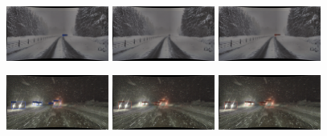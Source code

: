 \documentclass[report.tex]{subfiles}
\begin{document}
\begin{figure}[h!]
        \includegraphics[width=0.3\textwidth]{images/results/mtdetr/samples/snow_1/2018-02-12_09-32-09_00510_gt.png}
        \includegraphics[width=0.3\textwidth]{images/results/mtdetr/samples/snow_1/2018-02-12_09-32-09_00510_m_clr.png}
        \includegraphics[width=0.3\textwidth]{images/results/mtdetr/samples/snow_1/2018-02-12_09-32-09_00510_t_clr.png}

        \includegraphics[width=0.3\textwidth]{images/results/mtdetr/samples/snow_2/2018-02-12_18-05-56_00060_gt.png}
        \includegraphics[width=0.3\textwidth]{images/results/mtdetr/samples/snow_2/2018-02-12_18-05-56_00060_m_clr.png}
        \includegraphics[width=0.3\textwidth]{images/results/mtdetr/samples/snow_2/2018-02-12_18-05-56_00060_t_clr.png}


\end{figure}
\end{document}
